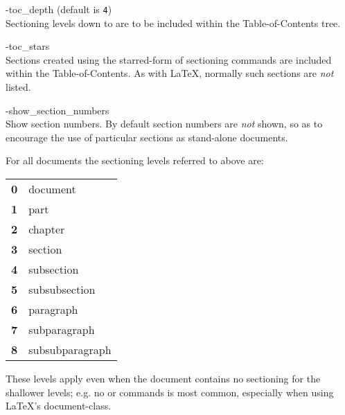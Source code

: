 \begin{htmllist}
%

\begin{changebar}
\item [ -toc\_depth  \Meta{num}\label{tocdepth}]
 (default is \texttt{4})\\
Sectioning levels down to  are to be included
within the Table-of-Contents tree.%

%

\item [ -toc\_stars\label{tocstars}]
\\
Sections created using the starred-form of sectioning commands
are included within the Table-of-Contents.
As with \LaTeX, normally such sections are \emph{not} listed.
%
\end{changebar}%

%

\item [ -show\_section\_numbers\label{showsecnums}]
\\
Show section numbers. By default section numbers are \emph{not} shown,
so as to encourage the use of particular sections as stand-alone documents.
%
\end{htmllist}

\goodbreak
{}\label{seclevels}%
\html{\\}\noindent
For all documents the sectioning levels referred to above are:\nobreak
\begin{center}
\begin{tabular}{ll}
\textbf{0} & document\\
\textbf{1} & part\\
\textbf{2} & chapter\\
\textbf{3} & section\\
\textbf{4} & subsection\\
\textbf{5} & subsubsection\\
\textbf{6} & paragraph\\
\textbf{7} & subparagraph\\
\textbf{8} & subsubparagraph
\end{tabular}
\end{center}
These levels apply even when the document contains no sectioning for
the shallower levels; e.g. no  or  commands is most common,
especially when using \LaTeX's  document-class.



